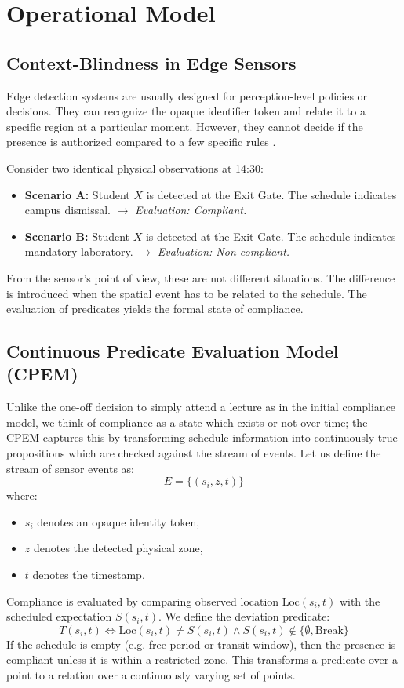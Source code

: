 \documentclass[conference]{IEEEtran}
\begin{document}
\section{Operational Model}

\subsection{Context-Blindness in Edge Sensors}
Edge detection systems are usually designed for perception-level policies or decisions. They can recognize the opaque identifier token and relate it to a specific region at a particular moment. However, they cannot decide if the presence is authorized compared to a few specific rules \cite{b5}.

Consider two identical physical observations at 14:30:
\begin{itemize}
    \item \textbf{Scenario A:} Student $X$ is detected at the Exit Gate. The schedule indicates campus dismissal. $\rightarrow$ \textit{Evaluation: Compliant.}
    \item \textbf{Scenario B:} Student $X$ is detected at the Exit Gate. The schedule indicates mandatory laboratory. $\rightarrow$ \textit{Evaluation: Non-compliant.}
\end{itemize}

From the sensor's point of view, these are not different situations. The difference is introduced when the spatial event has to be related to the schedule. The evaluation of predicates yields the formal state of compliance.

\subsection{Continuous Predicate Evaluation Model (CPEM)}
Unlike the one-off decision to simply attend a lecture as in the initial compliance model, we think of compliance as a state which exists or not over time; the CPEM captures this by transforming schedule information into continuously true propositions which are checked against the stream of events. Let us define the stream of sensor events as:
\begin{equation}
E = \{(s_i, z, t)\}
\end{equation}
where:
\begin{itemize}
    \item $s_i$ denotes an opaque identity token,
    \item $z$ denotes the detected physical zone,
    \item $t$ denotes the timestamp.
\end{itemize}
Compliance is evaluated by comparing observed location $\text{Loc}(s_i, t)$ with the scheduled expectation $S(s_i, t)$. We define the deviation predicate:
\begin{equation}
T(s_i, t) \iff \text{Loc}(s_i, t) \neq S(s_i, t) \land S(s_i, t) \notin \{\emptyset, \text{Break}\}
\end{equation}
If the schedule is empty (e.g. free period or transit window), then the presence is compliant unless it is within a restricted zone. This transforms a predicate over a point to a relation over a continuously varying set of points.
\end{document}
